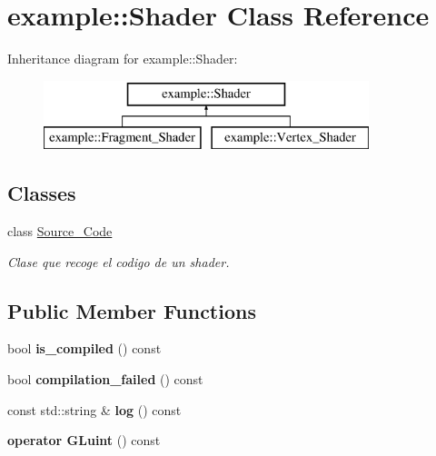 \hypertarget{classexample_1_1_shader}{}\section{example\+::Shader Class Reference}
\label{classexample_1_1_shader}
Inheritance diagram for example\+::Shader\+:\begin{figure}[H]
\begin{center}
\leavevmode
\includegraphics[height=2.000000cm]{classexample_1_1_shader}
\end{center}
\end{figure}
\subsection*{Classes}
\begin{DoxyCompactItemize}
\item 
class \mbox{\hyperlink{classexample_1_1_shader_1_1_source___code}{Source\+\_\+\+Code}}
\begin{DoxyCompactList}\small\item\em Clase que recoge el codigo de un shader. \end{DoxyCompactList}\end{DoxyCompactItemize}
\subsection*{Public Member Functions}
\begin{DoxyCompactItemize}
\item 
\mbox{\label{classexample_1_1_shader_abd0acb5a26b8829d6e81908b487fa329}} 
bool {\bfseries is\+\_\+compiled} () const
\item 
\mbox{\label{classexample_1_1_shader_ae2203671e91aa91ae726e9c3b1894077}} 
bool {\bfseries compilation\+\_\+failed} () const
\item 
\mbox{\label{classexample_1_1_shader_a4d5153ab0443d4747e076ad9e6d88d1c}} 
const std\+::string \& {\bfseries log} () const
\item 
\mbox{\label{classexample_1_1_shader_aa2639e785a366ebe1837e550833150e8}} 
{\bfseries operator G\+Luint} () const
\end{DoxyCompactItemize}
